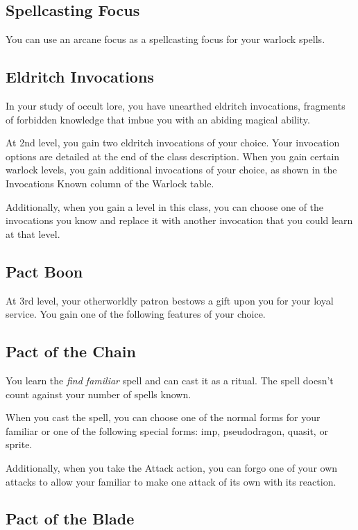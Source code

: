 \subsection{Spellcasting Focus}

You can use an arcane focus as a spellcasting focus for your warlock spells.

\subsection{Eldritch Invocations}

In your study of occult lore, you have unearthed eldritch invocations, fragments of forbidden knowledge that imbue you with an abiding magical ability.

At 2nd level, you gain two eldritch invocations of your choice. Your invocation options are detailed at the end of the class description. When you gain certain warlock levels, you gain additional invocations of your choice, as shown in the Invocations Known column of the Warlock table.

Additionally, when you gain a level in this class, you can choose one of the invocations you know and replace it with another invocation that you could learn at that level.

\subsection{Pact Boon}

At 3rd level, your otherworldly patron bestows a gift upon you for your loyal service. You gain one of the following features of your choice.

\subsection{Pact of the Chain}

You learn the \textit{find familiar} spell and can cast it as a ritual. The spell doesn't count against your number of spells known.

When you cast the spell, you can choose one of the normal forms for your familiar or one of the following special forms: imp, pseudodragon, quasit, or sprite.

Additionally, when you take the Attack action, you can forgo one of your own attacks to allow your familiar to make one attack of its own with its reaction.

\subsection{Pact of the Blade}


